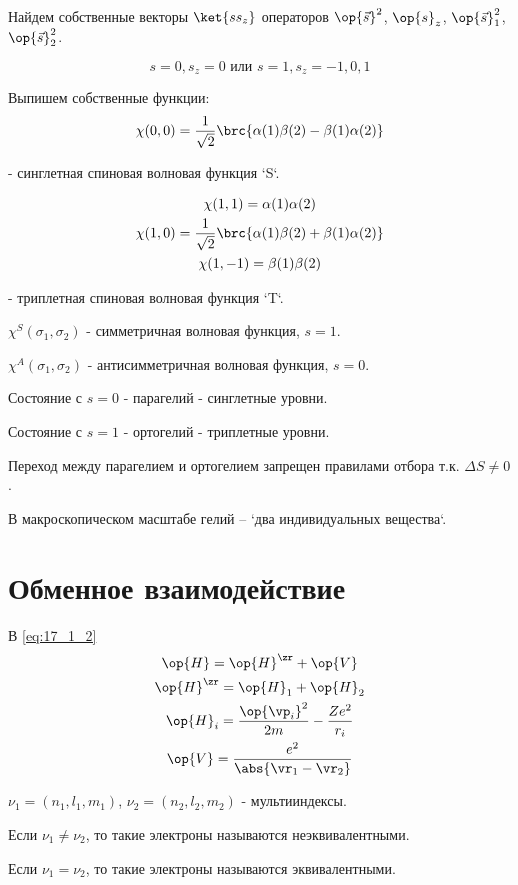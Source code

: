 Найдем собственные векторы $\ket{s s_z}$ операторов $\op{\vec{s}}^2$, $\op{s}_z$, $\op{\vec{s}}_1^2$, $\op{\vec{s}}_2^2$.

$$
s = 0, s_z = 0 \text{    или    } s = 1, s_z=-1, 0, 1
$$

Выпишем собственные функции:
$$
\chi(0, 0) = \frac{1}{\sqrt{2}}\brc{\alpha(1)\beta(2) - \beta(1)\alpha(2)}
$$

- синглетная спиновая волновая функция `S`.

\begin{gather*}
\chi(1, 1) = \alpha(1)\alpha(2) \\
\chi(1, 0) = \frac{1}{\sqrt{2}}\brc{\alpha(1)\beta(2) + \beta(1)\alpha(2)} \\
\chi(1, -1) = \beta(1)\beta(2)
\end{gather*}

- триплетная спиновая волновая функция `T`.

$\chi^S(\sigma_1, \sigma_2)$ - симметричная волновая функция, $s = 1$.

$\chi^A(\sigma_1, \sigma_2)$ - антисимметричная волновая функция, $s = 0$.

Состояние с $s = 0$ - парагелий - синглетные уровни.

Состояние с $s = 1$ - ортогелий - триплетные уровни.

Переход между парагелием и ортогелием запрещен правилами отбора т.к. $\Delta S \not = 0$.

В макроскопическом масштабе гелий -- `два индивидуальных вещества`.

\section{Обменное взаимодействие}

В \eqref{eq:17_1_2}
\begin{gather*}
\op{H} = \op{H}^\zr + \op{V} \\
\op{H}^\zr = \op{H}_1 + \op{H}_2 \\
\op{H}_i = \frac{\op{\vp_i}^2}{2m} - \frac{Ze^2}{r_i} \\
\op{V} = \frac{e^2}{\abs{\vr_1 - \vr_2}}
\end{gather*}

$\nu_1 = (n_1, l_1, m_1)$, $\nu_2 = (n_2, l_2, m_2)$ - мультииндексы.

Если $\nu_1 \not = \nu_2$, то такие электроны называются неэквивалентными.

Если $\nu_1 = \nu_2$, то такие электроны называются эквивалентными.

